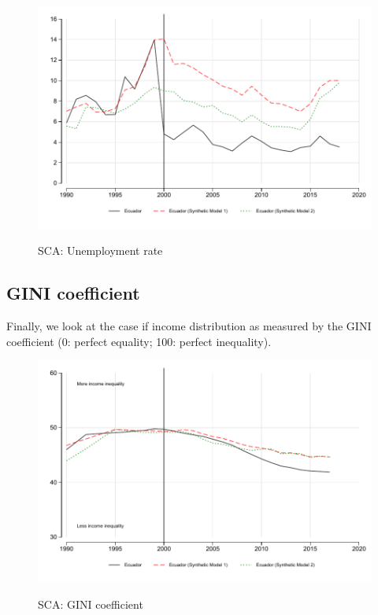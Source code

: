 \documentclass[12pt]{article}
\begin{document}


\begin{figure}[!h]
    \caption{SCA: Unemployment rate}
    \centering
    \includegraphics{STATA/Fig_UNEMP_SCA.pdf}
    \label{fig:SCA_UNEMP}
\end{figure}

\subsection{GINI coefficient}

Finally, we look at the case if income distribution as measured by the GINI coefficient (0: perfect equality; 100: perfect inequality). 



\begin{figure}[!h]
    \caption{SCA: GINI coefficient}
    \centering
    \includegraphics{STATA/Fig_GINI_SCA.pdf}
    \label{fig:SCA_UNEMP}
\end{figure}






\newpage
\singlespacing
\printbibliography


\end{document}

